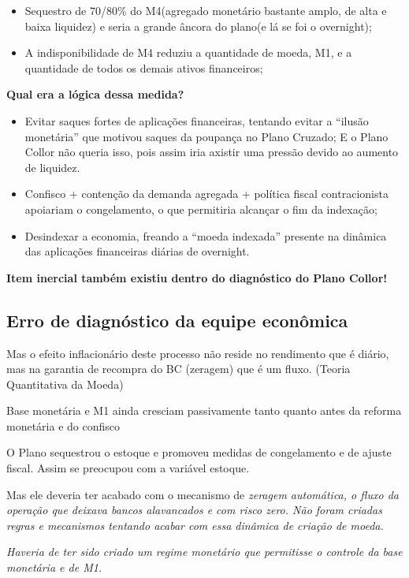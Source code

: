 \documentclass[a4paper,12pt]{article}[abntex2]
\begin{document}
\begin{itemize}
    \item Sequestro de 70/80\% do M4(agregado monetário bastante amplo, de alta e baixa liquidez) e seria a grande âncora do plano(e lá se foi o overnight);
    \item A indisponibilidade de M4 reduziu a quantidade de moeda, M1, e a quantidade de todos os demais ativos financeiros;
\end{itemize}

\textbf{Qual era a lógica dessa medida?}
\begin{itemize}
    \item Evitar saques fortes de aplicações financeiras, tentando evitar a “ilusão monetária” que motivou saques da poupança no Plano Cruzado; E o Plano Collor não queria isso, pois assim iria axistir uma pressão devido ao aumento de liquidez.
    \item Confisco + contenção da demanda agregada + política fiscal contracionista apoiariam o congelamento, o que permitiria alcançar o fim da indexação;
    \item Desindexar a economia, freando a “moeda indexada” presente na dinâmica das aplicações financeiras diárias de overnight.
\end{itemize}

\textbf{Item inercial também existiu dentro do diagnóstico do Plano Collor!}

\subsection{\textbf{Erro de diagnóstico da equipe econômica}}
Mas o efeito inflacionário deste processo não reside no rendimento que é diário, mas na garantia de recompra do BC (zeragem) que é um fluxo. (Teoria Quantitativa da Moeda)

Base monetária e M1 ainda cresciam passivamente tanto quanto antes da reforma monetária e do confisco

O Plano sequestrou o estoque e promoveu medidas de congelamento e de ajuste fiscal. Assim se preocupou com a variável estoque.

Mas ele deveria ter acabado com o mecanismo de \textit{zeragem automática, o fluxo da operação que deixava bancos alavancados e com risco zero. Não foram criadas regras e mecanismos tentando acabar com essa dinâmica de criação de moeda.}

\textit{Haveria de ter sido criado um regime monetário que permitisse o controle da base monetária e de M1.}
\end{document}
